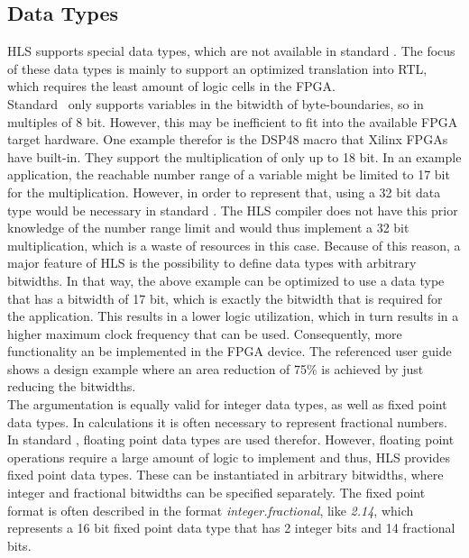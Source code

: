 \subsection{Data Types}

HLS supports special data types, which are not available in standard \cplusplus.
The focus of these data types is mainly to support an optimized translation into RTL, which requires the least amount of logic cells in the FPGA.\\

Standard \cplusplus\ only supports variables in the bitwidth of byte-boundaries, so in multiples of 8 bit.
However, this may be inefficient to fit into the available FPGA target hardware.
One example therefor is the DSP48 macro that Xilinx FPGAs have built-in.
They support the multiplication of only up to 18 bit.
In an example application, the reachable number range of a variable might be limited to 17 bit for the multiplication.
However, in order to represent that, using a 32 bit data type would be necessary in standard \cplusplus.
The HLS compiler does not have this prior knowledge of the number range limit and would thus implement a 32 bit multiplication, which is a waste of resources in this case.
Because of this reason, a major feature of HLS is the possibility to define data types with arbitrary bitwidths.
In that way, the above example can be optimized to use a data type that has a bitwidth of 17 bit, which is exactly the bitwidth that is required for the application.
This results in a lower logic utilization, which in turn results in a higher maximum clock frequency that can be used.
Consequently, more functionality an be implemented in the FPGA device.
The referenced user guide shows a design example where an area reduction of 75\% is achieved by just reducing the bitwidths.\\

The argumentation is equally valid for integer data types, as well as fixed point data types.
In calculations it is often necessary to represent fractional numbers.
In standard \cplusplus, floating point data types are used therefor.
However, floating point operations require a large amount of logic to implement and thus, HLS provides fixed point data types.
These can be instantiated in arbitrary bitwidths, where integer and fractional bitwidths can be specified separately.
The fixed point format is often described in the format \textit{integer.fractional}, like \textit{2.14}, which represents a 16 bit fixed point data type that has 2 integer bits and 14 fractional bits.\\

